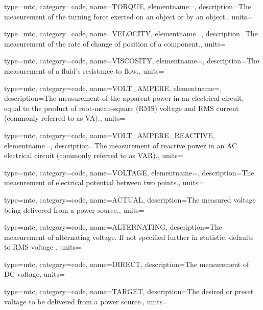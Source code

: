 {
  type=mtc,
  category=code,
  name={TORQUE},
  elementname=,
  description={The measurement of the turning force exerted on an object or by an object.},
  units=
}

{
  type=mtc,
  category=code,
  name={VELOCITY},
  elementname=,
  description={The measurement of the rate of change of position of a \gls{component}.},
  units=
}

{
  type=mtc,
  category=code,
  name={VISCOSITY},
  elementname=,
  description={The measurement of a fluid’s resistance to flow.},
  units=
}

{
  type=mtc,
  category=code,
  name={VOLT\_AMPERE},
  elementname=,
  description={The measurement of the apparent power in an electrical circuit, equal to the product of root-mean-square (RMS) voltage and RMS current (commonly referred to as VA).},
  units=
}

{
  type=mtc,
  category=code,
  name={VOLT\_AMPERE\_REACTIVE},
  elementname=,
  description={The measurement of reactive power in an AC electrical circuit (commonly referred to as VAR).},
  units=
}

{
  type=mtc,
  category=code,
  name={VOLTAGE},
  elementname=,
  description={The measurement of electrical potential between two points.},
  units=
}

{
  type=mtc,
  category=code,
  name={ACTUAL},
  description={The measured voltage being delivered from a power source.},
  units=
}

{
  type=mtc,
  category=code,
  name={ALTERNATING},
  description={The measurement of alternating voltage.   If not specified further in statistic, defaults to RMS voltage  },
  units=
}

{
  type=mtc,
  category=code,
  name={DIRECT},
  description={The measurement of DC voltage},
  units=
}

{
  type=mtc,
  category=code,
  name={TARGET},
  description={The desired or preset voltage to be delivered from a power source.},
  units=
}


